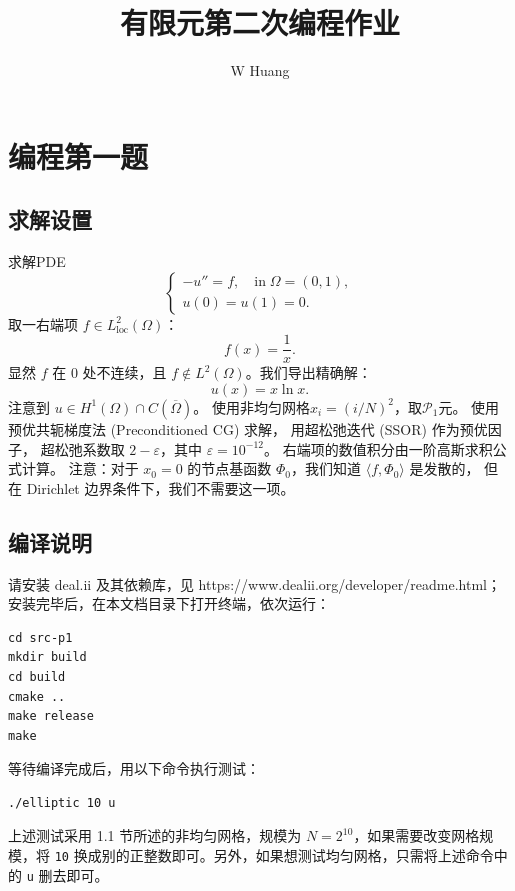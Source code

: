 \documentclass[lang=cn,11pt,a4paper]{elegantpaper}
\title{有限元第二次编程作业}
\author{W Huang}
\date{\zhtoday}
\begin{document}
\maketitle

\section{编程第一题}

\subsection{求解设置}

求解PDE
\begin{equation}
    \left\{
        \begin{array}{l}
            -u'' = f,\quad \text{in}\;\Omega=(0,1),\\
            u(0) = u(1) = 0.
        \end{array}
    \right.
\end{equation}
取一右端项 $f\in L_\text{loc}^2(\Omega)$：
\begin{equation}
    f(x)=\frac{1}{x}.
\end{equation}
显然 $f$ 在 $0$ 处不连续，且 $f\notin L^2(\Omega)$。我们导出精确解：
\begin{equation}
    u(x)=x\ln x.
\end{equation}
注意到 $u\in H^1(\Omega)\cap C(\overline{\Omega})$。
使用非均匀网格$x_i=(i/N)^2$，取$\mathcal{P}_1$元。
使用预优共轭梯度法 (Preconditioned CG) 求解，
用超松弛迭代 (SSOR) 作为预优因子，
超松弛系数取 $2-\varepsilon$，其中 $\varepsilon=10^{-12}$。
右端项的数值积分由一阶高斯求积公式计算。
注意：对于 $x_0=0$ 的节点基函数 $\Phi_0$，我们知道
$\langle f, \Phi_0 \rangle$ 是发散的，
但在 Dirichlet 边界条件下，我们不需要这一项。

\subsection{编译说明}

请安装 deal.ii 及其依赖库，见 https://www.dealii.org/developer/readme.html；安装完毕后，在本文档目录下打开终端，依次运行：
\begin{lstlisting}
cd src-p1
mkdir build
cd build
cmake ..
make release
make
\end{lstlisting}
等待编译完成后，用以下命令执行测试：
\begin{lstlisting}
./elliptic 10 u
\end{lstlisting}
上述测试采用 1.1 节所述的非均匀网格，规模为 $N=2^{10}$，如果需要改变网格规模，将 \verb|10| 换成别的正整数即可。另外，如果想测试均匀网格，只需将上述命令中的 \verb|u| 删去即可。
\end{document}
